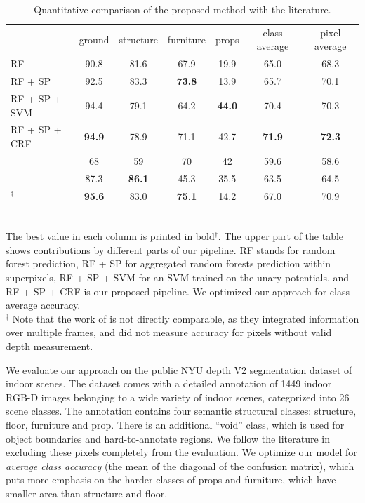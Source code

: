 \documentclass[a4paper, 10pt, conference]{ieeeconf}      %
\begin{document}
\begin{table}[t]
    \caption{Quantitative comparison of the proposed method with the
    literature.}
\begin{tabularx}{\linewidth}{@{\extracolsep{\fill}}lcccccc}
\toprule
                        & ground        &  structure    & furniture     & props         & class average   & pixel average\\
\cmidrule(r){1-7}

RF                              &         90.8  &   81.6        & 67.9          & 19.9          &  65.0        &  68.3 \\
RF + SP                         &         92.5  &   83.3        & \textbf{73.8} & 13.9          &  65.7        &  70.1 \\ 
RF + SP + SVM                   &         94.4  &   79.1        & 64.2          & \textbf{44.0} &  70.4        &  70.3 \\
RF + SP + CRF                   & \textbf{94.9} &   78.9        &          71.1 & 42.7          &\textbf{71.9} &  \textbf{72.3} \\
\cmidrule(r){1-7}
\citet{SilbermanECCV12}         &         68    &   59          & 70           & 42            &  59.6        & 58.6 \\
\citet{couprie-iclr-13}         &         87.3  & \textbf{86.1} & 45.3         & 35.5          &  63.5        & 64.5 \\
\cmidrule(r){1-7}
\citet{stueckler2013}$^\dagger$ & \textbf{95.6} &   83.0        & \textbf{75.1}& 14.2          &  67.0        & 70.9 \\

\bottomrule
\end{tabularx}
\quad\\The best value in each column is printed in bold$^\dagger$. The upper part of
the table shows contributions by different parts of our pipeline. RF stands for random forest prediction, RF + SP for aggregated
random forests prediction within superpixels, RF + SP + SVM for an SVM trained on the unary potentials, and RF + SP + CRF is
our proposed pipeline. We optimized our approach for class average
accuracy.\\
$^\dagger$ \footnotesize Note that the work of \citet{stueckler2013} is not directly
comparable, as they integrated information over multiple frames, and did not
measure accuracy for pixels without valid depth measurement.
\end{table}

We evaluate our approach on the public NYU depth V2 segmentation dataset of
indoor scenes.  The dataset comes with a detailed annotation of 1449 indoor
RGB-D images belonging to a wide variety of indoor scenes, categorized into 26
scene classes.  The annotation contains four semantic structural classes:
structure, floor, furniture and prop. There is an additional ``void'' class,
which is used for object boundaries and hard-to-annotate regions. We follow the
literature in excluding these pixels completely from the evaluation.
We optimize our model for \emph{average class accuracy} (the mean of the
diagonal of the confusion matrix), which puts more emphasis on the harder
classes of props and furniture, which have smaller area than structure and
floor.
\end{document}
